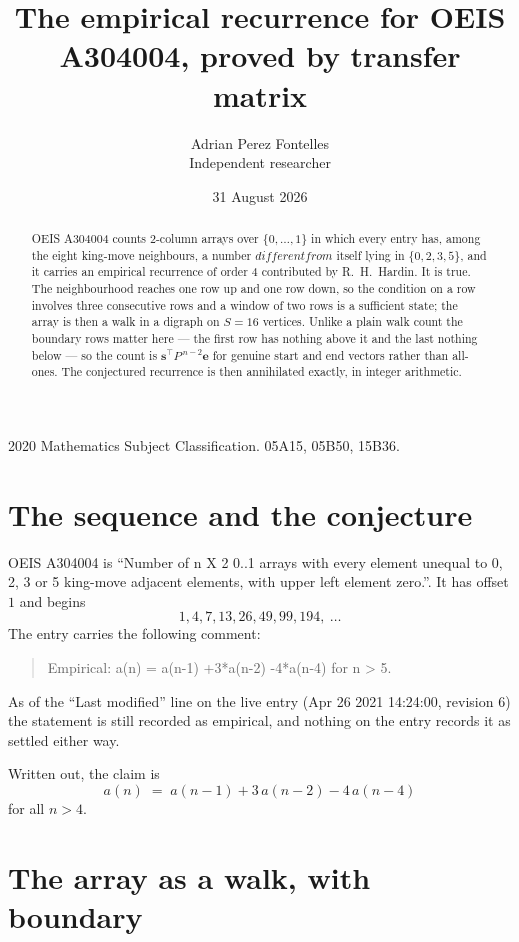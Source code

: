 \documentclass[11pt,a4paper]{article}
\title{The empirical recurrence for OEIS A304004, proved by transfer matrix}
\author{Adrian Perez Fontelles\\ \small Independent researcher}
\date{31 August 2026}
\theoremstyle{plain}
\theoremstyle{definition}
\begin{document}
\maketitle

\begin{abstract}
OEIS A304004 counts $2$-column arrays over $\{0,\dots,1\}$ in which every entry has,
among the eight king-move neighbours, a number $different from$ itself lying in $\{0,2,3,5\}$, and it carries an empirical
recurrence of order $4$ contributed by R.~H.~Hardin. It is true. The neighbourhood
reaches one row up and one row down, so the condition on a row involves three consecutive
rows and a window of two rows is a sufficient state; the array is then a walk in a digraph
on $S=16$ vertices. Unlike a plain walk count the boundary rows matter here --- the first
row has nothing above it and the last nothing below --- so the count is
$\mathbf{s}^{\!\top}P^{\,n-2}\mathbf{e}$ for genuine start and end vectors rather than
all-ones. The conjectured recurrence is then annihilated exactly, in integer arithmetic.
\end{abstract}

\noindent\small 2020 Mathematics Subject Classification. 05A15, 05B50, 15B36.\normalsize

\section{The sequence and the conjecture}

OEIS A304004 is ``Number of n X 2 0..1 arrays with every element unequal to 0, 2, 3 or 5 king-move adjacent elements, with upper left element zero.''. It has offset
$1$ and begins
\[
1, 4, 7, 13, 26, 49, 99, 194,\ \dots
\]
The entry carries the following comment:
\begin{quote}\small
Empirical: a(n) = a(n-1) +3*a(n-2) -4*a(n-4) for n > 5.
\end{quote}
As of the ``Last modified'' line on the live entry (Apr 26 2021 14:24:00, revision
6) the statement is still recorded as empirical, and nothing on the entry
records it as settled either way.

Written out, the claim is
\begin{equation}\label{eq:conj}
a(n)\;=\;a(n-1) + 3\,a(n-2) - 4\,a(n-4)
\end{equation}
for all $n>4$.

\section{The array as a walk, with boundary}
\end{document}
